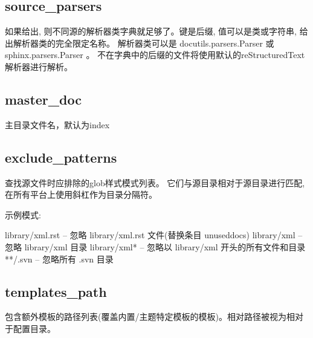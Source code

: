 \documentclass[a4paper,10pt,english]{sphinxmanual}
\begin{document}
\subsection{source\_parsers}
\label{\detokenize{sphinx_conf:source-parsers}}
\sphinxAtStartPar
如果给出, 则不同源的解析器类字典就足够了。键是后缀, 值可以是类或字符串, 给出解析器类的完全限定名称。
解析器类可以是 docutils.parsers.Parser 或 sphinx.parsers.Parser 。
不在字典中的后缀的文件将使用默认的reStructuredText解析器进行解析。

\begin{sphinxVerbatim}[commandchars=\\\{\}]
   
\end{sphinxVerbatim}


\subsection{master\_doc}
\label{\detokenize{sphinx_conf:master-doc}}
\sphinxAtStartPar
主目录文件名，默认为index


\subsection{exclude\_patterns}
\label{\detokenize{sphinx_conf:exclude-patterns}}
\sphinxAtStartPar
查找源文件时应排除的glob样式模式列表。 它们与源目录相对于源目录进行匹配, 在所有平台上使用斜杠作为目录分隔符。

\sphinxAtStartPar
示例模式:

\begin{sphinxVerbatim}[commandchars=\\\{\}]
\PYGZsq{}library/xml.rst\PYGZsq{} – 忽略 library/xml.rst 文件(替换条目 unused\PYGZus{}docs)
\PYGZsq{}library/xml\PYGZsq{} – 忽略 library/xml 目录
\PYGZsq{}library/xml*\PYGZsq{} – 忽略以 library/xml 开头的所有文件和目录
\PYGZsq{}**/.svn\PYGZsq{} – 忽略所有 .svn 目录
\end{sphinxVerbatim}


\subsection{templates\_path}
\label{\detokenize{sphinx_conf:templates-path}}
\sphinxAtStartPar
包含额外模板的路径列表(覆盖内置/主题特定模板的模板)。相对路径被视为相对于配置目录。
\end{document}
